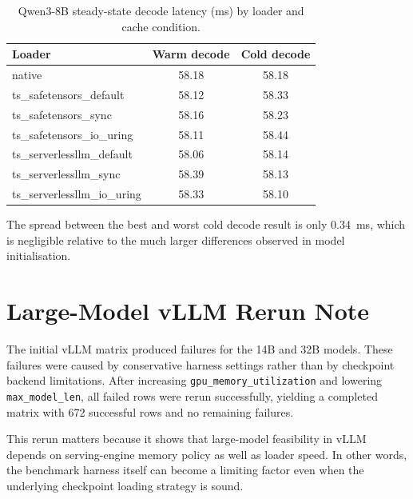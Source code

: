 \begin{table}[h]
\caption{Qwen3-8B steady-state decode latency (ms) by loader and cache condition.}
\label{tab:vllm-extra}
\centering
\begin{tabular}{lcc}
\toprule
Loader & Warm decode & Cold decode \\
\midrule
native & 58.18 & 58.18 \\
ts\_safetensors\_default & 58.12 & 58.33 \\
ts\_safetensors\_sync & 58.16 & 58.23 \\
ts\_safetensors\_io\_uring & 58.11 & 58.44 \\
ts\_serverlessllm\_default & 58.06 & 58.14 \\
ts\_serverlessllm\_sync & 58.39 & 58.13 \\
ts\_serverlessllm\_io\_uring & 58.33 & 58.10 \\
\bottomrule
\end{tabular}
\end{table}

The spread between the best and worst cold decode result is only 0.34~ms, which is negligible relative to the much larger differences observed in model initialisation.

\section{Large-Model vLLM Rerun Note}

The initial vLLM matrix produced failures for the 14B and 32B models. These failures were caused by conservative harness settings rather than by checkpoint backend limitations. After increasing \texttt{gpu\_memory\_utilization} and lowering \texttt{max\_model\_len}, all failed rows were rerun successfully, yielding a completed matrix with 672 successful rows and no remaining failures.

This rerun matters because it shows that large-model feasibility in vLLM depends on serving-engine memory policy as well as loader speed. In other words, the benchmark harness itself can become a limiting factor even when the underlying checkpoint loading strategy is sound.
